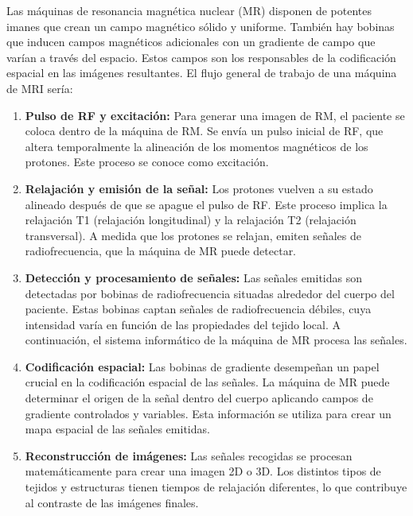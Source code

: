 \documentclass[
  a4paper,
]{scrreprt}
\begin{document}
Las máquinas de resonancia magnética nuclear (MR) disponen de potentes
imanes que crean un campo magnético sólido y uniforme. También hay
bobinas que inducen campos magnéticos adicionales con un gradiente de
campo que varían a través del espacio. Estos campos son los responsables
de la codificación espacial en las imágenes resultantes. El flujo
general de trabajo de una máquina de MRI sería:

\begin{enumerate}
\def\labelenumi{\arabic{enumi}.}
\item
  \textbf{Pulso de RF y excitación:} Para generar una imagen de RM, el
  paciente se coloca dentro de la máquina de RM. Se envía un pulso
  inicial de RF, que altera temporalmente la alineación de los momentos
  magnéticos de los protones. Este proceso se conoce como excitación.
\item
  \textbf{Relajación y emisión de la señal:} Los protones vuelven a su
  estado alineado después de que se apague el pulso de RF. Este proceso
  implica la relajación T1 (relajación longitudinal) y la relajación T2
  (relajación transversal). A medida que los protones se relajan, emiten
  señales de radiofrecuencia, que la máquina de MR puede detectar.
\item
  \textbf{Detección y procesamiento de señales:} Las señales emitidas
  son detectadas por bobinas de radiofrecuencia situadas alrededor del
  cuerpo del paciente. Estas bobinas captan señales de radiofrecuencia
  débiles, cuya intensidad varía en función de las propiedades del
  tejido local. A continuación, el sistema informático de la máquina de
  MR procesa las señales.
\item
  \textbf{Codificación espacial:} Las bobinas de gradiente desempeñan un
  papel crucial en la codificación espacial de las señales. La máquina
  de MR puede determinar el origen de la señal dentro del cuerpo
  aplicando campos de gradiente controlados y variables. Esta
  información se utiliza para crear un mapa espacial de las señales
  emitidas.
\item
  \textbf{Reconstrucción de imágenes:} Las señales recogidas se procesan
  matemáticamente para crear una imagen 2D o 3D. Los distintos tipos de
  tejidos y estructuras tienen tiempos de relajación diferentes, lo que
  contribuye al contraste de las imágenes finales.
\end{enumerate}
\end{document}
